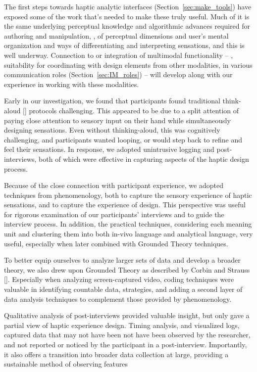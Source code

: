 The first steps towards haptic analytic interfaces (Section~\ref{sec:make_tools}) have exposed some of the work that's needed to make these truly useful. Much of it is the same underlying perceptual knowledge and  algorithmic advances required for authoring and manipulation, \eg, of perceptual dimensions and user's mental organization and ways of differentiating and interpreting sensations, and this is well underway. 
%
Connection to or integration of multimodal functionality -- \eg, suitability for coordinating with design elements from other modalities, in various communication roles (Section~\ref{sec:IM_roles}) -- will develop along with our experience in working with these modalities. 



Early in our investigation, we found that participants found traditional think-aloud [] protocols challenging.
This appeared to be due to a split attention of paying close attention to sensory input on their hand while simultaneously designing sensations.
Even without thinking-aloud, this was cognitively challenging, and participants wanted looping, or would step back to refine and feel their sensations.
In response, we adopted unintrusive logging and post-interviews, both of which were effective in capturing aspects of the haptic design process. 

Because of the close connection with participant experience, we adopted techniques from phenomenology, both to capture the sensory experience of haptic sensations, and to capture the experience of design.
This perspective was useful for rigorous examination of our participants' interviews and to guide the interview process.
In addition, the practical techniques, considering each meaning unit and clustering them into both in-vivo language and analytical language, very useful, especially when later combined with Grounded Theory techniques.

To better equip ourselves to analyze larger sets of data and develop a broader theory, we also drew upon Grounded Theory as described by Corbin and Strauss [].
Especially when analyzing screen-captured video, coding techniques were valuable in identifying countable data, strategies, and adding a second layer of data analysis techniques to complement those provided by phenomenology.

Qualitative analysis of post-interviews provided valuable insight, but only gave a partial view of haptic experience design.
Timing analysis, and visualized logs, captured data that may not have been not have been observed by the researcher, and not reported or noticed by the participant in a post-interview.
Importantly, it also offers a transition into broader data collection at large, providing a sustainable method of observing features


